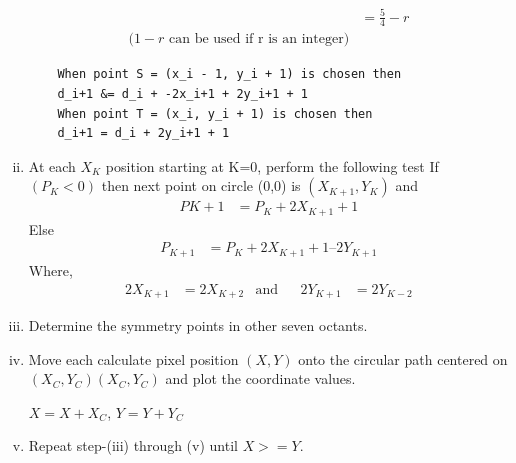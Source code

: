 \documentclass[11pt]{report}
\begin{document}
\begin{enumerate}[(i)]
\begin{align*}
	&= \frac{5}{4} - r\\ \text{($1-r$ can be used if r is an integer)}
	\end{align*}
	\begin{lstlisting}			
	When point S = (x_i - 1, y_i + 1) is chosen then
	d_i+1 &= d_i + -2x_i+1 + 2y_i+1 + 1
	When point T = (x_i, y_i + 1) is chosen then
	d_i+1 = d_i + 2y_i+1 + 1
	\end{lstlisting}
	\item At each $X_K$ position starting at K=0, perform the following test 
	\newline If $(P_K < 0)$ then next point on circle (0,0) is $(X_{K+1},Y_K)$ and
	\begin{align*}
	PK+1 &= P_K + 2X_{K+1} + 1
	\end{align*}
	Else
	\begin{align*}
	P_{K+1} &= P_K + 2X_{K+1} + 1 – 2Y_{K+1}
	\end{align*}
	Where, 
	\begin{align*}
	2X_{K+1} &= 2X_{K+2} &\text{and} && 2Y_{K+1} &= 2Y_{K-2}
	\end{align*}
	\item Determine the symmetry points in other seven octants.
	\item Move each calculate pixel position $(X, Y)$ onto the circular path centered on $(X_C,Y_C)(X_C,Y_C)$ and plot the coordinate values.
	
	$X = X + X_C$,   $Y = Y + Y_C$
	\item Repeat step-(iii) through (v) until $X >= Y$.
\end{enumerate}
\end{document}
